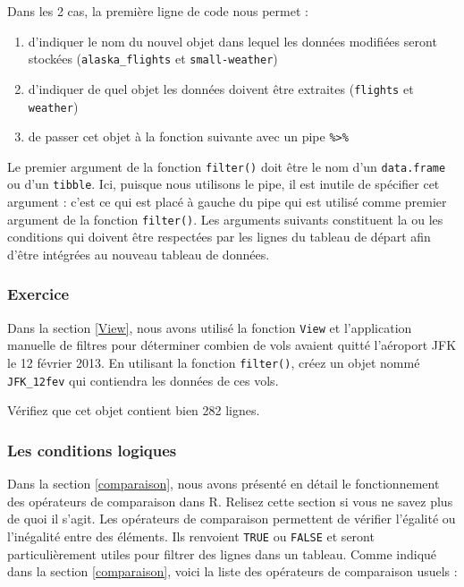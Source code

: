 \documentclass[a4paperpaper,]{article}
\providecommand{\tightlist}{%
  \setlength{\itemsep}{0pt}\setlength{\parskip}{0pt}}
\theoremstyle{definition}
\theoremstyle{definition}
\theoremstyle{definition}
\theoremstyle{remark}
\begin{document}
Dans les 2 cas, la première ligne de code nous permet :

\begin{enumerate}
\def\labelenumi{\arabic{enumi}.}
\tightlist
\item
  d'indiquer le nom du nouvel objet dans lequel les données modifiées
  seront stockées (\texttt{alaska\_flights} et \texttt{small-weather})
\item
  d'indiquer de quel objet les données doivent être extraites
  (\texttt{flights} et \texttt{weather})
\item
  de passer cet objet à la fonction suivante avec un pipe
  \texttt{\%\textgreater{}\%}
\end{enumerate}

Le premier argument de la fonction \texttt{filter()} doit être le nom
d'un \texttt{data.frame} ou d'un \texttt{tibble}. Ici, puisque nous
utilisons le pipe, il est inutile de spécifier cet argument : c'est ce
qui est placé à gauche du pipe qui est utilisé comme premier argument de
la fonction \texttt{filter()}. Les arguments suivants constituent la ou
les conditions qui doivent être respectées par les lignes du tableau de
départ afin d'être intégrées au nouveau tableau de données.

\hypertarget{exercice-1}{%
\subsubsection{Exercice}\label{exercice-1}}

Dans la section \ref{View}, nous avons utilisé la fonction \texttt{View}
et l'application manuelle de filtres pour déterminer combien de vols
avaient quitté l'aéroport JFK le 12 février 2013. En utilisant la
fonction \texttt{filter()}, créez un objet nommé \texttt{JFK\_12fev} qui
contiendra les données de ces vols.

Vérifiez que cet objet contient bien 282 lignes.

\hypertarget{les-conditions-logiques}{%
\subsubsection{Les conditions logiques}\label{les-conditions-logiques}}

Dans la section \ref{comparaison}, nous avons présenté en détail le
fonctionnement des opérateurs de comparaison dans R. Relisez cette
section si vous ne savez plus de quoi il s'agit. Les opérateurs de
comparaison permettent de vérifier l'égalité ou l'inégalité entre des
éléments. Ils renvoient \texttt{TRUE} ou \texttt{FALSE} et seront
particulièrement utiles pour filtrer des lignes dans un tableau. Comme
indiqué dans la section \ref{comparaison}, voici la liste des opérateurs
de comparaison usuels :
\end{document}
